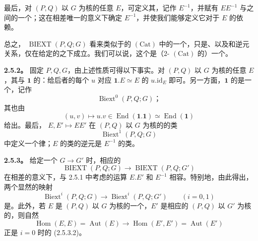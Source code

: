 最后，对 $(P,Q)$ 以 $G$ 为核的任意 $E$，可定义其，记作 $E^{-1}$，并赋有 $EE^{-1}$ 与之间的一个；这在相差唯一的意义下确定 $E^{-1}$，并使我们能够定义它对于 $E$ 的依赖。

总之， $\operatorname{BIEXT}(P,Q;G)$ 看来类似于的 $(\mathrm{Cat})$ 中的一个，只是、以及和逆元关系，仅在给定的之下成立。我们可以说，这个是（$2$- $(\mathrm{Cat})$ 的）一个。

\textbf{2.5.2。} 固定 $P,Q,G$，由上述性质可得以下事实。对 $(P,Q)$ 以 $G$ 为核的任意 $E$，其与 $\mathbf1$ 的：给后者的每个 $u$ 对应 $\mathbf1.E\simeq E$ 的 $u.\mathrm{id}_E$ 即可。另一方面，$\mathbf1$ 的是一个，记作
\[
\operatorname{Biext}^0(P,Q;G)；\tag{2.5.2.1}
\]
其也由
\[
(u,v)\longmapsto u.v\in\operatorname{End}(\mathbf1.\mathbf1)\simeq\operatorname{End}(\mathbf1)
\]
给出。最后， $E,E'\mapsto EE'$ 在 $(P,Q)$ 以 $G$ 为核的的类
\[
\operatorname{Biext}^1(P,Q;G)\tag{2.5.2.2}
\]
中定义一个律；$E$ 的类的逆元是 $E^{-1}$ 的类。

\textbf{2.5.3。} 给定一个 $G\to G'$ 时，相应的
\[
\operatorname{BIEXT}(P,Q;G)\longrightarrow\operatorname{BIEXT}(P,Q;G')\tag{2.5.3.1}
\]
在相差的意义下，与 2.5.1 中考虑的运算 $E.E'$ 和 $E^{-1}$ 相容。特别地，由此得出，两个显然的映射
\[
\operatorname{Biext}^i(P,Q;G)\longrightarrow\operatorname{Biext}^i(P,Q;G')\qquad(i=0,1)\tag{2.5.3.2}
\]
是。此外，若 $E$ 是 $(P,Q)$ 以 $G$ 为核的一个，$E'$ 是相应的 $(P,Q)$ 以 $G'$ 为核的，则自然
\[
\operatorname{Hom}(E,E)=\operatorname{Aut}(E)\longrightarrow
\operatorname{Hom}(E',E')=\operatorname{Aut}(E')\tag{2.5.3.3}
\]
正是 $i=0$ 时的 (2.5.3.2)。

